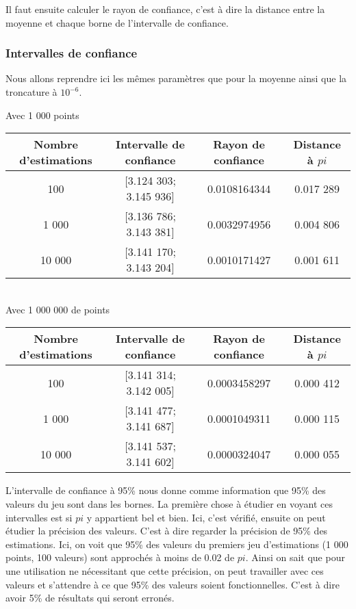 \documentclass[a4paper]{article}
\begin{document}
Il faut ensuite calculer le rayon de confiance, c'est à dire la distance entre la moyenne et chaque borne de l'intervalle de confiance.

\begin{mdframed}[backgroundcolor=light-gray, roundcorner=20pt,
	leftmargin=-45, rightmargin=-45, 
	innerleftmargin=20, innertopmargin=1, innerbottommargin=1, 
	outerlinewidth=1, linecolor=darkgray]
	
\end{mdframed}

\subsubsection{Intervalles de confiance}
Nous allons reprendre ici les mêmes paramètres que pour la moyenne ainsi que la troncature à $10^{-6}$.
	
	\begin{center}
		Avec 1 000 points \\
		\begin{tabular}{|c||c|c|c|}
			\hline
			Nombre d'estimations & Intervalle de confiance & Rayon de confiance & Distance à $pi$
			\\\hline
			100 & [3.124 303; 3.145 936] & 0.0108164344 & 0.017 289
			\\\hline
			1 000 & [3.136 786; 3.143 381] & 0.0032974956 & 0.004 806
			\\\hline
			10 000 & [3.141 170; 3.143 204] & 0.0010171427 & 0.001 611
			\\\hline
		\end{tabular}\\
		\medskip
		Avec 1 000 000 de points \\
		\begin{tabular}{|c||c|c|c|}
			\hline
			Nombre d'estimations & Intervalle de confiance & Rayon de confiance & Distance à $pi$
			\\\hline
			100 & [3.141 314; 3.142 005] & 0.0003458297 & 0.000 412
			\\\hline
			1 000 & [3.141 477; 3.141 687] & 0.0001049311 & 0.000 115
			\\\hline
			10 000 & [3.141 537; 3.141 602] & 0.0000324047 & 0.000 055
			\\\hline
		\end{tabular}
	\end{center}

L'intervalle de confiance à 95\% nous donne comme information que 95\% des valeurs du jeu sont dans les bornes.
La première chose à étudier en voyant ces intervalles est si $pi$ y appartient bel et bien. Ici, c'est vérifié, 
ensuite on peut étudier la précision des valeurs. C'est à dire regarder la précision de 95\% des estimations.
Ici, on voit que 95\% des valeurs du premiers jeu d'estimations (1 000 points, 100 valeurs) sont approchés à moins de 0.02 de $pi$.
Ainsi on sait que pour une utilisation ne nécessitant que cette précision, on peut travailler avec ces valeurs 
et s'attendre à ce que 95\% des valeurs soient fonctionnelles. C'est à dire avoir 5\% de résultats qui seront erronés.
\end{document}
